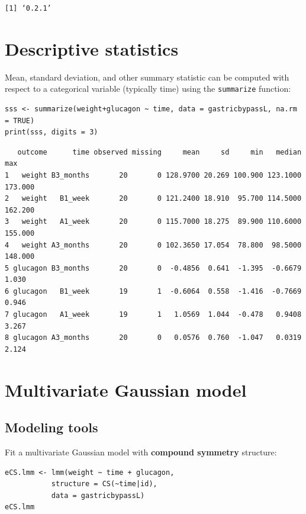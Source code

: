 \documentclass[12pt]{article}
\begin{document}
\begin{verbatim}
[1] ‘0.2.1’
\end{verbatim}


\clearpage

\section{Descriptive statistics}
\label{sec:org6de7648}
Mean, standard deviation, and other summary statistic can be computed
with respect to a categorical variable (typically time) using the
\texttt{summarize} function:
\lstset{language=r,label= ,caption= ,captionpos=b,numbers=none}
\begin{lstlisting}
sss <- summarize(weight+glucagon ~ time, data = gastricbypassL, na.rm = TRUE)
print(sss, digits = 3)
\end{lstlisting}

\begin{verbatim}
   outcome      time observed missing     mean     sd     min   median     max
1   weight B3_months       20       0 128.9700 20.269 100.900 123.1000 173.000
2   weight   B1_week       20       0 121.2400 18.910  95.700 114.5000 162.200
3   weight   A1_week       20       0 115.7000 18.275  89.900 110.6000 155.000
4   weight A3_months       20       0 102.3650 17.054  78.800  98.5000 148.000
5 glucagon B3_months       20       0  -0.4856  0.641  -1.395  -0.6679   1.030
6 glucagon   B1_week       19       1  -0.6064  0.558  -1.416  -0.7669   0.946
7 glucagon   A1_week       19       1   1.0569  1.044  -0.478   0.9408   3.267
8 glucagon A3_months       20       0   0.0576  0.760  -1.047   0.0319   2.124
\end{verbatim}


\clearpage

\section{Multivariate Gaussian model}
\label{sec:org9f26fc7}
\subsection{Modeling tools}
\label{sec:orgfaeca84}
Fit a multivariate Gaussian model with \textbf{compound symmetry} structure:
\lstset{language=r,label= ,caption= ,captionpos=b,numbers=none}
\begin{lstlisting}
eCS.lmm <- lmm(weight ~ time + glucagon,
	       structure = CS(~time|id),
	       data = gastricbypassL)
eCS.lmm
\end{lstlisting}
\end{document}
